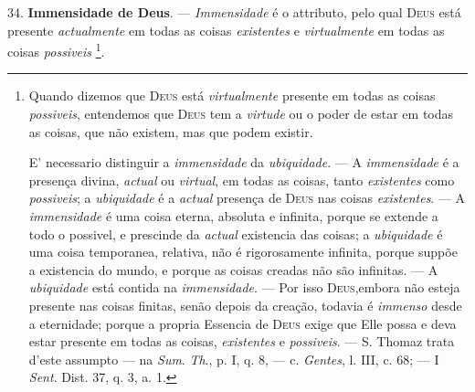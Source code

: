 34. \textbf{Immensidade de Deus}. --- \emph{Immensidade} é o attributo, pelo qual \textsc{Deus} está presente \emph{actualmente} em todas as coisas \emph{existentes} e \emph{virtualmente} em todas as coisas \emph{possiveis} \footnote{Quando dizemos que \textsc{Deus} está \emph{virtualmente} presente em todas as coisas \emph{possiveis}, entendemos que \textsc{Deus} tem a \emph{virtude} ou o poder de estar em todas as coisas, que não existem, mas que podem existir.\par E' necessario distinguir a \emph{immensidade} da \emph{ubiquidade}. --- A \emph{immensidade} é a presença divina, \emph{actual} ou \emph{virtual}, em todas as coisas, tanto \emph{existentes} como \emph{possiveis}; a \emph{ubiquidade} é a \emph{actual} presença de \textsc{Deus} nas coisas \emph{existentes}. --- A \emph{immensidade} é uma coisa eterna, absoluta e infinita, porque se extende a todo o possivel, e prescinde da \emph{actual} existencia das coisas; a \emph{ubiquidade} é uma coisa temporanea, relativa, não é rigorosamente infinita, porque suppõe a existencia do mundo, e porque as coisas creadas não são infinitas. --- A \emph{ubiquidade} está contida na \emph{immensidade}. --- Por isso \textsc{Deus},embora não esteja presente nas coisas finitas, senão depois da creação, todavia é \emph{immenso} desde a eternidade; porque a propria Essencia de \textsc{Deus} exige que Elle possa e deva estar presente em todas as coisas, \emph{existentes} e \emph{possiveis}. --- S. Thomaz trata d'este assumpto --- na \emph{Sum}. \emph{Th}., p. I, q. 8, --- c. \emph{Gentes}, l. III, c. 68; --- I \emph{Sent}. Dist. 37, q. 3, a. 1.}.

